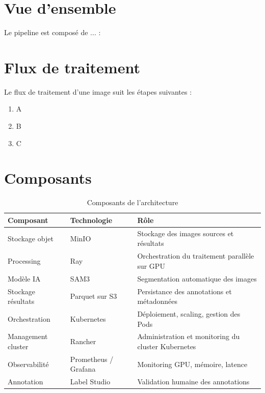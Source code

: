 \section{Vue d'ensemble}

Le pipeline est composé de ... :
\section{Flux de traitement}

Le flux de traitement d'une image suit les étapes suivantes :

\begin{enumerate}
    \item A
    \item B
    \item C
\end{enumerate}

\section{Composants}

\begin{table}[H]
\centering
\begin{tabular}{|l|l|p{7cm}|}
\hline
\textbf{Composant} & \textbf{Technologie} & \textbf{Rôle} \\
\hline
Stockage objet & MinIO & Stockage des images sources et résultats \\
\hline
Processing & Ray & Orchestration du traitement parallèle sur GPU \\
\hline
Modèle IA & SAM3 & Segmentation automatique des images \\
\hline
Stockage résultats & Parquet sur S3 & Persistance des annotations et métadonnées \\
\hline
Orchestration & Kubernetes & Déploiement, scaling, gestion des Pods \\
\hline
Management cluster & Rancher & Administration et monitoring du cluster Kubernetes \\
\hline
Observabilité & Prometheus / Grafana & Monitoring GPU, mémoire, latence \\
\hline
Annotation & Label Studio & Validation humaine des annotations \\
\hline
\end{tabular}
\caption{Composants de l'architecture}
\label{tab:composants}
\end{table}
